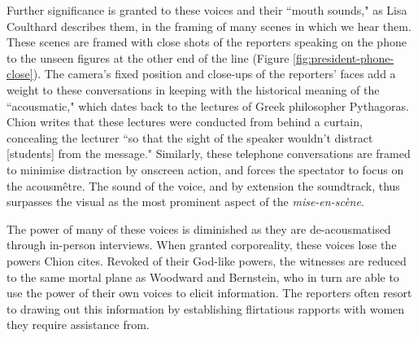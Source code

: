 Further significance is granted to these voices and their ``mouth sounds," as Lisa Coulthard describes them, in the framing of many scenes in which we hear them.\autocites[][188]{coulthard_acoustic_2016}
These scenes are framed with close shots of the reporters speaking on the phone to the unseen figures at the other end of the line (Figure \ref{fig:president-phone-close}).
The camera's fixed position and close-ups of the reporters' faces add a weight to these conversations in keeping with the historical meaning of the ``acousmatic," which dates back to the lectures of Greek philosopher Pythagoras.
Chion writes that these lectures were conducted from behind a curtain, concealing the lecturer ``so that the sight of the speaker wouldn't distract [students] from the message."\autocites[][19]{chion_voice_1999}
Similarly, these telephone conversations are framed to minimise distraction by onscreen action, and forces the spectator to focus on the acousmêtre.
The sound of the voice, and by extension the soundtrack, thus surpasses the visual as the most prominent aspect of the \textit{mise-en-scène}.

The power of many of these voices is diminished as they are de-acousmatised through in-person interviews.
When granted corporeality, these voices lose the powers Chion cites.
Revoked of their God-like powers, the witnesses are reduced to the same mortal plane as Woodward and Bernstein, who in turn are able to use the power of their own voices to elicit information.
The reporters often resort to drawing out this information by establishing flirtatious rapports with women they require assistance from.

